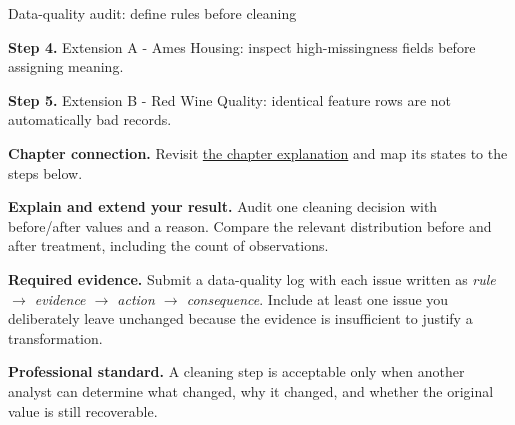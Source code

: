 \begin{labproject}{Data-quality audit: define rules before cleaning}


\noindent\textbf{Step 4.} Extension A - Ames Housing: inspect high-missingness fields before assigning meaning.


\noindent\textbf{Step 5.} Extension B - Red Wine Quality: identical feature rows are not automatically bad records.

\textbf{Chapter connection.} Revisit \hyperref[ch:quality]{the chapter explanation} and map its states to the steps below.


\begin{verification}
\textbf{Explain and extend your result.} Audit one cleaning decision with before/after values and a reason. Compare the relevant distribution before and after treatment, including the count of observations.


\textbf{Required evidence.} Submit a data-quality log with each issue written as \emph{rule $\rightarrow$ evidence $\rightarrow$ action $\rightarrow$ consequence}. Include at least one issue you deliberately leave unchanged because the evidence is insufficient to justify a transformation.

\textbf{Professional standard.} A cleaning step is acceptable only when another analyst can determine what changed, why it changed, and whether the original value is still recoverable.
\end{verification}
\end{labproject}
